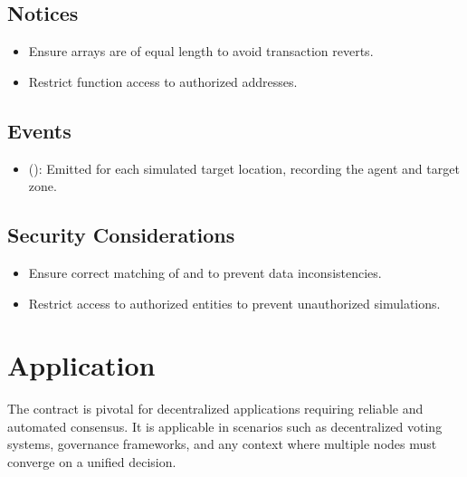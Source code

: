 \documentclass[a4paper,10pt,english]{sphinxmanual}
\begin{document}
\subsection{Notices}
\label{\detokenize{docs_consensus_mechanism_contract:notices}}\begin{itemize}
\item {} 
\sphinxAtStartPar
{} Ensure arrays are of equal length to avoid transaction reverts.

\item {} 
\sphinxAtStartPar
{} Restrict function access to authorized addresses.

\end{itemize}


\subsection{Events}
\label{\detokenize{docs_consensus_mechanism_contract:events}}\begin{itemize}
\item {} 
\sphinxAtStartPar
{} ():
Emitted for each simulated target location, recording the agent and target zone.

\end{itemize}


\subsection{Security Considerations}
\label{\detokenize{docs_consensus_mechanism_contract:id10}}\begin{itemize}
\item {} 
\sphinxAtStartPar
{} Ensure correct matching of  and  to prevent data inconsistencies.

\item {} 
\sphinxAtStartPar
{} Restrict access to authorized entities to prevent unauthorized simulations.

\end{itemize}


\section{Application}
\label{\detokenize{docs_consensus_mechanism_contract:application}}
\sphinxAtStartPar
The  contract is pivotal for decentralized applications requiring reliable and automated consensus. It is applicable in scenarios such as decentralized voting systems, governance frameworks, and any context where multiple nodes must converge on a unified decision.
\end{document}
